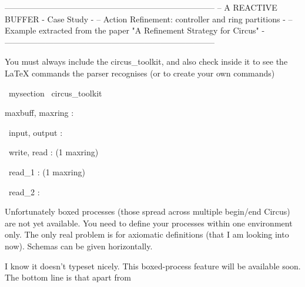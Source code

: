 -----------------------------------------------------------------------------
-- A REACTIVE BUFFER    - Case Study                                                                                    -
-- Action Refinement: controller and ring partitions                                                -
-- Example extracted from the paper "A Refinement Strategy for Circus"          -
-----------------------------------------------------------------------------

You must always include the circus\_toolkit, and also check inside
it to see the LaTeX commands the parser recognises (or to create
your own commands)

\begin{zsection}
  \SECTION\ mysection \parents\ circus\_toolkit
\end{zsection}

\begin{axdef}
 maxbuff, maxring : \nat
\end{axdef}

\begin{circus}
 \circchannel\ input, output : \nat
\end{circus}

\begin{circus}
 \circchannel\ write, read : (1 \upto maxring) \cross \nat
\end{circus}

\begin{circus}
 \circchannel\ read\_1 : (1 \upto maxring)
\end{circus}

\begin{circus}
 \circchannel\ read\_2 : \nat
\end{circus}

Unfortunately boxed processes (those spread across multiple
begin/end Circus) are not yet available. You need to define your
processes within one environment only. The only real problem is for
axiomatic definitions (that I am looking into now). Schemas can be
given horizontally.

I know it doesn't typeset nicely. This boxed-process feature will be
available soon. The bottom line is that apart from

